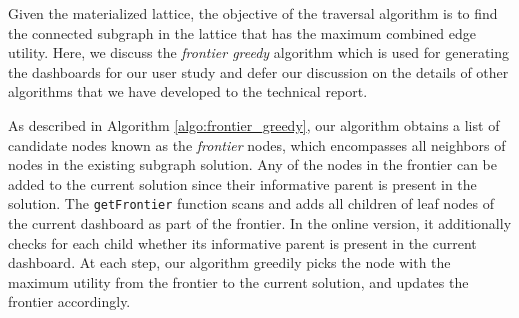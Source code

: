  Given the materialized lattice, the objective of the traversal algorithm is to find the connected subgraph in the lattice that has the maximum combined edge utility. Here, we discuss the \textit{frontier greedy} algorithm which is used for generating the dashboards for our user study and defer our discussion on the details of other algorithms that we have developed to the technical report.
\par As described in Algorithm \ref{algo:frontier_greedy}, our algorithm obtains a list of candidate nodes known as the \textit{frontier} nodes, which encompasses all neighbors of nodes in the existing subgraph solution. Any of the nodes in the frontier can be added to the current solution since their informative parent is present in the solution. The \texttt{getFrontier} function scans and adds all children of leaf nodes of the current dashboard as part of the frontier. In the online version, it additionally checks for each child whether its informative parent is present in the current dashboard. At each step, our algorithm greedily picks the node with the maximum utility from the frontier to the current solution, and updates the frontier accordingly.

